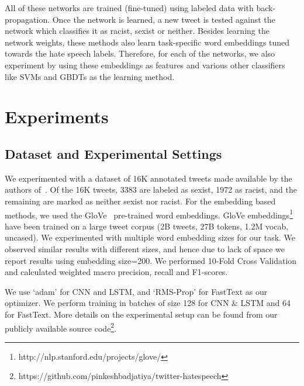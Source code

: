 \documentclass[letterpaper]{sig-alternate-2013}
\begin{document}
All of these networks are trained (fine-tuned) using labeled data with back-propagation. Once the network is learned, a new tweet is tested against the network which classifies it as racist, sexist or neither. Besides learning the network weights, these methods also learn task-specific word embeddings tuned towards the hate speech labels. Therefore, for each of the networks, we also experiment by using these embeddings as features and various other classifiers like SVMs and GBDTs as the learning method.

\section{Experiments}

\subsection{Dataset and Experimental Settings}
We experimented with a dataset of 16K annotated tweets made available by the authors of~\cite{waseem2016hateful}. Of the 16K tweets, 3383 are labeled as sexist, 1972 as racist, and the remaining are marked as neither sexist nor racist. For the embedding based methods, we used the GloVe~\cite{pennington2014glove} pre-trained word embeddings. GloVe embeddings\footnote{http://nlp.stanford.edu/projects/glove/} have been trained on a large tweet corpus (2B tweets, 27B tokens, 1.2M vocab, uncased). We experimented with multiple word embedding sizes for our task. We observed similar results with different sizes, and hence due to lack of space we report results using embedding size=200. We performed 10-Fold Cross Validation and calculated weighted macro precision, recall and F1-scores.


We use `adam' for CNN and LSTM, and `RMS-Prop' for FastText as our optimizer. We perform training in batches of size 128 for CNN \& LSTM and 64 for FastText. More details on the experimental setup can be found from our publicly available source code\footnote{https://github.com/pinkeshbadjatiya/twitter-hatespeech}.
\end{document}
